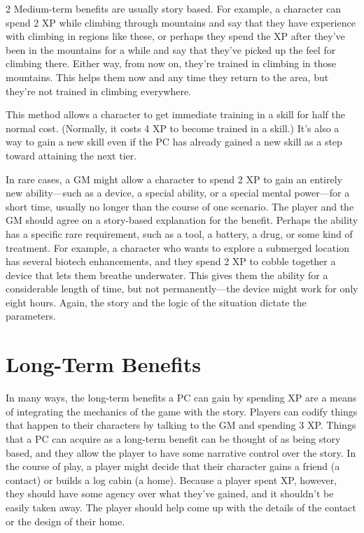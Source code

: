 \begin{multicols}{2}
Medium-term benefits are usually story based. For example, a character can spend 2 XP while climbing through mountains and say that they have experience with climbing in regions like these, or perhaps they spend the XP after they’ve been in the mountains for a while and say that they’ve picked up the feel for climbing there. Either way, from now on, they’re trained in climbing in those mountains. This helps them now and any time they return to the area, but they’re not trained in climbing everywhere.

This method allows a character to get immediate training in a skill for half the normal cost. (Normally, it costs 4 XP to become trained in a skill.) It’s also a way to gain a new skill even if the PC has already gained a new skill as a step toward attaining the next tier.

In rare cases, a GM might allow a character to spend 2 XP to gain an entirely new ability—such as a device, a special ability, or a special mental power—for a short time, usually no longer than the course of one scenario. The player and the GM should agree on a story-based explanation for the benefit. Perhaps the ability has a specific rare requirement, such as a tool, a battery, a drug, or some kind of treatment. For example, a character who wants to explore a submerged location has several biotech enhancements, and they spend 2 XP to cobble together a device that lets them breathe underwater. This gives them the ability for a considerable length of time, but not permanently—the device might work for only eight hours. Again, the story and the logic of the situation dictate the parameters.

\section{Long-Term Benefits}

In many ways, the long-term benefits a PC can gain by spending XP are a means of integrating the mechanics of the game with the story. Players can codify things that happen to their characters by talking to the GM and spending 3 XP. 
Things that a PC can acquire as a long-term benefit can be thought of as being story based, and they allow the player to have some narrative control over the story. In the course of play, a player might decide that their character gains a friend (a contact) or builds a log cabin (a home). Because a player spent XP, however, they should have some agency over what they’ve gained, and it shouldn’t be easily taken away. The player should help come up with the details of the contact or the design of their home.


\end{multicols}
